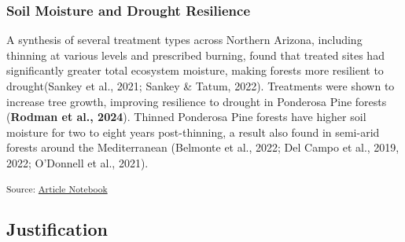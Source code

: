 \documentclass[
]{agujournal2019}
\begin{document}
\subsubsection{Soil Moisture and Drought
Resilience}\label{soil-moisture-and-drought-resilience}

A synthesis of several treatment types across Northern Arizona,
including thinning at various levels and prescribed burning, found that
treated sites had significantly greater total ecosystem moisture, making
forests more resilient to drought(Sankey et al., 2021; Sankey \& Tatum,
2022). Treatments were shown to increase tree growth, improving
resilience to drought in Ponderosa Pine forests (\textbf{Rodman et al.,
2024}). Thinned Ponderosa Pine forests have higher soil moisture for two
to eight years post-thinning, a result also found in semi-arid forests
around the Mediterranean (Belmonte et al., 2022; Del Campo et al., 2019,
2022; O'Donnell et al., 2021).

\textsubscript{Source:
\href{https://Ryan3Lima.github.io/ATUR-ForestThinning/index.ipynb.html}{Article
Notebook}}

\subsection{Justification}\label{justification}
\end{document}
